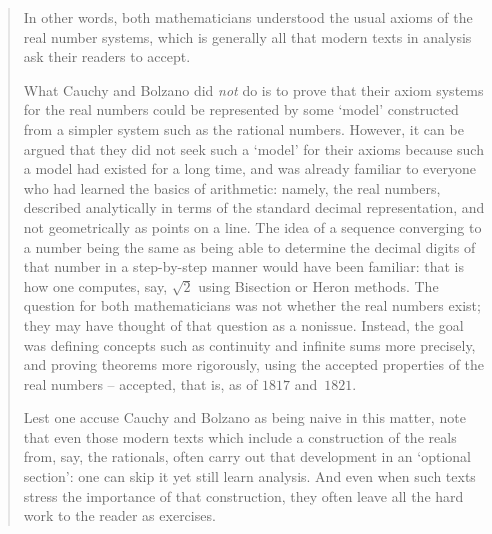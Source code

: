 \begin{quotation}
{        In other words, both mathematicians understood the usual axioms of the real number systems,
    which is generally all that modern texts in analysis ask their readers to accept.

        What Cauchy and Bolzano did {\em not} do is to prove that their axiom systems for the real numbers
    could be represented by some `model' constructed from a simpler system such as the rational numbers.
    However, it can be argued that they did not seek such a `model' for their axioms because such a model had existed for a long time,
    and was already familiar to everyone who had learned the basics of arithmetic:
    namely, the real numbers, described analytically in terms of the standard decimal representation, and not geometrically as points on a line.
    The idea of a sequence converging to a number being the same as being able to determine
    the decimal digits of that number in a step-by-step manner would have been familiar:
    that is how one computes, say,  $\sqrt{2}$ using Bisection or Heron methods.
    The question for both mathematicians was not whether the real numbers exist; they may have thought of that question as a nonissue.
    Instead, the goal was defining concepts such as continuity and infinite sums more precisely,
    and proving theorems more rigorously, using the accepted properties of the real numbers -- accepted, that is, as of $1817$ and~$1821$.

        Lest one accuse Cauchy and Bolzano as being naive in this matter, note that even those modern texts which include a construction of the reals from,
    say, the rationals, often carry out that development in an `optional section': one can skip it yet still learn analysis.
    And even when such texts stress the importance of that construction, they often leave all the hard work to the reader as exercises.
}%
\end{quotation}


